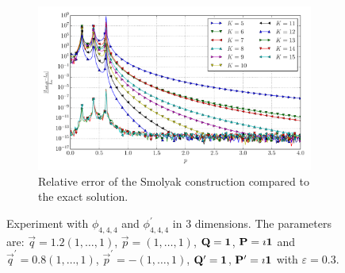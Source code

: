 \documentclass[a4paper,10pt]{article}
\begin{document}
\begin{figure}[ht!]
\begin{subfigure}[t]{0.5\linewidth}
    \includegraphics[width=\linewidth]{./plots/tp_sg_3d_conv_p_(4,4,4)_(4,4,4)_err_rel_nsd_gk.pdf}
    \caption{Relative error of the Smolyak construction compared to the exact solution.}
    \label{fig:tp_sg_3d_conv_p_444_444_err_rel_nsd_gk}
  \end{subfigure}
  \label{fig:tp_sg_3d_conv_p_444_444}
  \caption{Experiment with $\phi_{4,4,4}$ and $\phi_{4,4,4}^{\prime}$
  in 3 dimensions.
  The parameters are:
  $\vec{q} = 1.2 (1,\ldots,1)$,
  $\vec{p} = (1,\ldots,1)$,
  $\mathbf{Q} = \mathbf{1}$,
  $\mathbf{P} = \imath \mathbf{1}$
  and
  $\vec{q}^\prime = 0.8 (1,\ldots,1)$,
  $\vec{p}^\prime = -(1,\ldots,1)$,
  $\mathbf{Q}^\prime = \mathbf{1}$,
  $\mathbf{P}^\prime = \imath \mathbf{1}$
  with $\varepsilon=0.3$.}
\end{figure}
\end{document}
